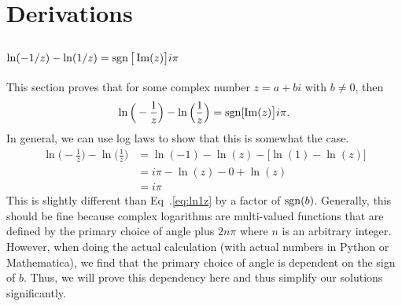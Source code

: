 \chapter{Derivations}

\section{$\ln(-1/z)-\ln(1/z)=\operatorname{sgn}\big[\operatorname{Im}(z)\big]i\pi$}
\label{s:ln1z}

This section proves that for some complex number $z = a + bi$ with $b \neq 0$, then
\begin{equation}
	\ln\Big(-\frac{1}{z}\Big) - \ln\Big(\frac{1}{z}\Big) = \operatorname{sgn}[\operatorname{Im}(z)\big] i \pi.
	\label{eq:ln1z}
\end{equation}
In general, we can use log laws to show that this is somewhat the case.
\begin{align}
	\ln\Big(-\frac{1}{z}\Big) - \ln\Big(\frac{1}{z}\Big) 
	&= \ln(-1) - \ln(z) - \big[ \ln(1) - \ln(z) \big] \nonumber \\
	&= i \pi - \ln(z) - 0 + \ln(z) \nonumber \\
	&= i \pi
\end{align}
This is slightly different than Eq~.\ref{eq:ln1z} by a 
factor of $\operatorname{sgn}(b)$. 
Generally, this should be fine because complex logarithms are multi-valued functions
that are defined by the primary choice of angle plus $2 n \pi$ where $n$ is an arbitrary integer.
However, when doing the actual calculation (with actual numbers in Python or Mathematica), 
we find that the primary choice of angle is dependent on the sign of $b$.
Thus, we will prove this dependency here and thus simplify our solutions significantly.

